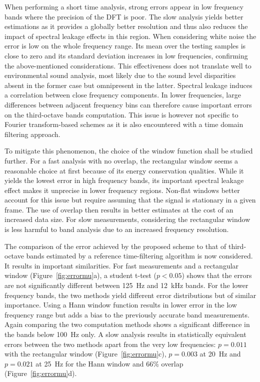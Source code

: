 \documentclass[sensors,article,submit,moreauthors,pdftex,10pt,a4paper]{mdpi}
\begin{document}
When performing a short time analysis, strong errors appear in low frequency bands where the precision of the DFT is poor. The slow analysis yields better estimations as it provides a globally better resolution and thus also reduces the impact of spectral leakage effects in this region. When considering white noise the error is low on the whole frequency range. Its mean over the testing samples is close to zero and its standard deviation increases in low frequencies, confirming the above-mentioned considerations. This effectiveness does not translate well to environmental sound analysis, most likely due to the sound level disparities absent in the former case but omnipresent in the latter. Spectral leakage induces a correlation between close frequency components. In lower frequencies, large differences between adjacent frequency bins can therefore cause important errors on the third-octave bands computation. This issue is however not specific to Fourier transform-based schemes as it is also encountered with a time domain filtering approach.

To mitigate this phenomenon, the choice of the window function shall be studied further. For a fast analysis with no overlap, the rectangular window seems a reasonable choice at first because of its energy conservation qualities. While it yields the lowest error in high frequency bands, its important spectral leakage effect makes it unprecise in lower frequency regions. Non-flat windows better account for this issue but require assuming that the signal is stationary in a given frame. The use of overlap then results in better estimates at the cost of an increased data size. For slow measurements, considering the rectangular window is less harmful to band analysis due to an increased frequency resolution.

The comparison of the error achieved by the proposed scheme to that of third-octave bands estimated by a reference time-filtering algorithm is now considered. It results in important similarities. For fast measurements and a rectangular window (Figure~\ref{fig:errormu}a), a student t-test ($p<0.05$) shows that the errors are not significantly different between 125~Hz and 12~kHz bands. For the lower frequency bands, the two methods yield different error distributions but of similar importance. Using a Hann window function results in lower error in the low frequency range but adds a bias to the previously accurate band measurements. Again comparing the two computation methods shows a significant difference in the bands below 100~Hz only. A slow analysis results in statistically equivalent errors between the two methods apart from the very low frequencies: $p = 0.011$ with the rectangular window (Figure~\ref{fig:errormu}c), $p = 0.003$ at 20~Hz and $p = 0.021$ at 25~Hz for the Hann window and 66\% overlap (Figure~\ref{fig:errormu}d).\\
\end{document}
